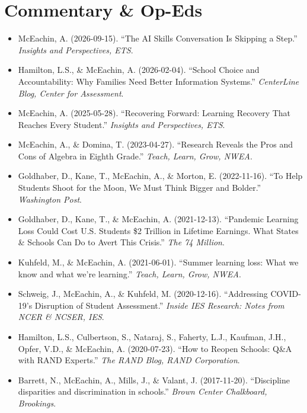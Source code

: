 \documentclass[11pt, letterpaper]{article}
\begin{document}
\section{Commentary \& Op-Eds}
\begin{itemize}
  \item McEachin, A. (2026-09-15).
  ``The AI Skills Conversation Is Skipping a Step.'' \textit{Insights and Perspectives, ETS}.

  \item Hamilton, L.S., \& McEachin, A. (2026-02-04).
  ``School Choice and Accountability: Why Families Need Better Information Systems.'' \textit{CenterLine Blog, Center for Assessment}.

  \item McEachin, A. (2025-05-28).
  ``Recovering Forward: Learning Recovery That Reaches Every Student.'' \textit{Insights and Perspectives, ETS}.

  \item McEachin, A., \& Domina, T. (2023-04-27).
  ``Research Reveals the Pros and Cons of Algebra in Eighth Grade.'' \textit{Teach, Learn, Grow, NWEA}.

  \item Goldhaber, D., Kane, T., McEachin, A., \& Morton, E. (2022-11-16).
  ``To Help Students Shoot for the Moon, We Must Think Bigger and Bolder.'' \textit{Washington Post}.

  \item Goldhaber, D., Kane, T., \& McEachin, A. (2021-12-13).
  ``Pandemic Learning Loss Could Cost U.S. Students \$2 Trillion in Lifetime Earnings. What States \& Schools Can Do to Avert This Crisis.'' \textit{The 74 Million}.

  \item Kuhfeld, M., \& McEachin, A. (2021-06-01).
  ``Summer learning loss: What we know and what we're learning.'' \textit{Teach, Learn, Grow, NWEA}.

  \item Schweig, J., McEachin, A., \& Kuhfeld, M. (2020-12-16).
  ``Addressing COVID-19's Disruption of Student Assessment.'' \textit{Inside IES Research: Notes from NCER \& NCSER, IES}.

  \item Hamilton, L.S., Culbertson, S., Nataraj, S., Faherty, L.J., Kaufman, J.H., Opfer, V.D., \& McEachin, A. (2020-07-23).
  ``How to Reopen Schools: Q\&A with RAND Experts.'' \textit{The RAND Blog, RAND Corporation}.

  \item Barrett, N., McEachin, A., Mills, J., \& Valant, J. (2017-11-20).
  ``Discipline disparities and discrimination in schools.'' \textit{Brown Center Chalkboard, Brookings}.


\end{itemize}
\end{document}
